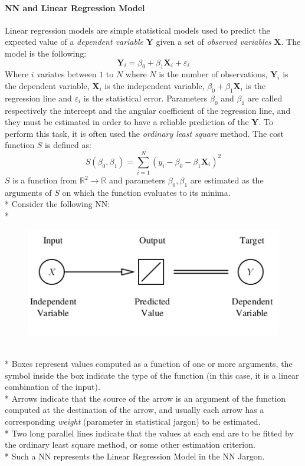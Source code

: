 \documentclass[10pt,a4paper]{article}
\begin{document}
	\paragraph{NN and Linear Regression Model}
	Linear regression models are simple statistical models used to predict the expected value of a \emph{dependent variable} $\textbf{Y}$ given a set of \emph{observed variables} $\textbf{X}$. The model is the following:
	$$
	\textbf{Y}_i = \beta_0 + \beta_1 \textbf{X}_i + \varepsilon_i
	$$
	Where $i$ variates between $1$ to $N$ where $N$ is the number of observations, $\textbf{Y}_i$ is the dependent variable, $\textbf{X}_i$ is the independent variable, $\beta_0 + \beta_1 \textbf{X}_i$ is the regression line and $\varepsilon_i$ is the statistical error. Parameters $\beta_0$ and $\beta_1$ are called respectively the intercept and the angular coefficient of the regression line, and they must be estimated in order to have a reliable prediction of the $\textbf{Y}$. To perform this task, it is often used the \emph{ordinary least square} method. The cost function $S$ is defined as:
	$$
	S(\beta_0,\beta_1) = \sum_{i=1}^N (y_i - \beta_0 - \beta_1 \textbf{X}_i)^2
	$$
	$S$ is a function from $\mathbb{R}^2 \rightarrow \mathbb{R}$ and parameters $\beta_0,\beta_1$ are estimated  as the arguments of $S$ on which the function evaluates to its minima.\\*
	Consider the following NN:\\*
	\begin{figure}[h!]
		\centering
		\includegraphics[scale=2.5]{img/linreg}
	\end{figure}\\*
	Boxes represent values computed as a function of one or more arguments, the symbol inside the box indicate the type of the function (in this case, it is a linear combination of the input).\\*
	Arrows indicate that the source of the arrow is an argument of the function computed at the destination of the arrow, and usually each arrow has a corresponding \emph{weight} (parameter in statistical jargon) to be estimated.\\*
	Two long parallel lines indicate that the values at each end are to be fitted by the ordinary least square method, or some other estimation criterion.\\*
	Such a NN represents the Linear Regression Model in the NN Jargon.
\end{document}
